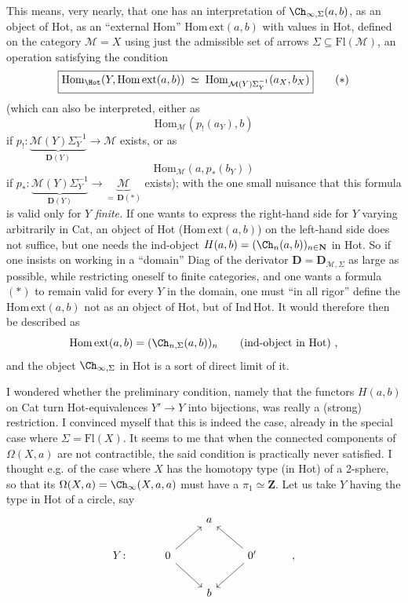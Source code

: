 This means, very nearly, that one has an interpretation of $\Ch_{\infty,\Sigma}(a,b)$, as an object of Hot, as an ``external Hom'' $\mathrm{Hom\,ext}(a,b)$ with values in Hot, defined on the category $\mathcal{M}=X$ using just the admissible set of arrows $\Sigma\subseteq\mathrm{Fl}(\mathcal{M})$, an operation satisfying the condition
\[ \boxed{\mathrm{Hom}_{\Hot}(Y,\mathrm{Hom\,ext}(a,b)) \;\simeq\; \mathrm{Hom}_{\mathcal{M}(Y)\Sigma_Y^{-1}}(a_X,b_X)} \tag*{$(*)$} \]
(which can also be interpreted, either as
\[ \mathrm{Hom}_{\mathcal{M}}(p_!(a_Y),b) \]
if $p_! : \underbrace{\mathcal{M}(Y)\Sigma_Y^{-1}}_{\mathbf{D}(Y)} \longrightarrow \mathcal{M}$ exists, or as
\[ \mathrm{Hom}_{\mathcal{M}}(a,p_*(b_Y)) \]
if $p_* : \underbrace{\mathcal{M}(Y)\Sigma_Y^{-1}}_{\mathbf{D}(Y)} \longrightarrow \underbrace{\mathcal{M}}_{=\,\mathbf{D}(*)}$ exists); with the one small nuisance that this formula is valid only for $Y$ \textit{finite.} If one wants to express the right-hand side for $Y$ varying arbitrarily in Cat, an object of Hot ($\mathrm{Hom\,ext}(a,b)$) on the left-hand side does not suffice, but one needs the ind-object $H(a,b) = (\Ch_n(a,b))_{n\in\mathbf{N}}$ in Hot. So if one insists on working in a ``domain'' Diag of the derivator $\mathbf{D}=\mathbf{D}_{\mathcal{M},\Sigma}$ as large as possible, while restricting oneself to finite categories,
and one wants a formula $(*)$ to remain valid for every $Y$ in the domain, one must ``in all rigor'' define the $\mathrm{Hom\,ext}(a,b)$ not as an object of Hot, but of Ind\,Hot. It would therefore then be described as
\[ \mathrm{Hom\,ext}(a,b) = (\Ch_{n,\Sigma}(a,b))_n \qquad \text{(ind-object in Hot)}\ , \]
and the object $\Ch_{\infty,\Sigma}$ in Hot is a sort of direct limit of it.

I wondered whether the preliminary condition, namely that the functors $H(a,b)$ on Cat turn Hot-equivalences $Y'\longrightarrow Y$ into bijections, was really a (strong) restriction. I convinced myself that this is indeed the case, already in the special case where $\Sigma=\mathrm{Fl}(X)$. It seems to me that when the connected components of $\Omega(X,a)$ are not contractible, the said condition is practically never satisfied. I thought e.g. of the case where $X$ has the homotopy type (in Hot) of a 2-sphere, so that its $\Omega(X,a)=\Ch_\infty(X,a,a)$ must have a $\pi_1\simeq\mathbf{Z}$. Let us take $Y$ having the type in Hot of a circle, say
\[
\begin{tikzcd}
 & & a & & \\
Y\colon & 0 \arrow[ur] \arrow[dr] & & 0' \arrow[ul] \arrow[dl] & , \\
 & & b & &
\end{tikzcd}
\]

